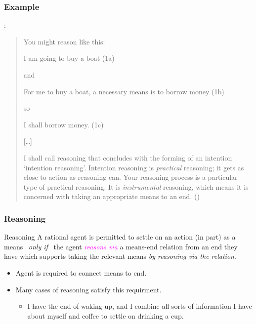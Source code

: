 \documentclass[noamssymb,
]{beamer} %
\begin{document}
\begin{frame}
  \frametitle{Example}

  \citeauthor{Broome:2002aa}:

\begin{quote}
  You might reason like this:

  \mbox{}\quad I am going to buy a boat \hfill (1a)

  and

  \mbox{}\quad For me to buy a boat, a necessary means is to borrow money \hfill (1b)

  so

  \mbox{}\quad I shall borrow money. \hfill (1c)

  \begin{center}
    [\dots]
  \end{center}

  I shall call reasoning that concludes with the forming of an intention `intention reasoning'.
  Intention reasoning is \emph{practical} reasoning; it gets as close to action as reasoning can.
  Your reasoning process is a particular type of practical reasoning.
  It is \emph{instrumental} reasoning, which means it is concerned with taking an appropriate means to an end.\nolinebreak
  \mbox{}\hfill\mbox{(\citeyear[86]{Broome:2002aa})}
\end{quote}
\end{frame}

\begin{frame}
  \frametitle{Reasoning}

  \begin{block}{Reasoning}
    A rational agent is permitted to settle on an action (in part) as a means
    \newline
    \mbox{ }\hfill\emph{only if}\hfill\mbox{ }
    \newline
    the agent \textcolor{fuchsia}{\emph{reasons via}} a means-end relation from an end they have which supports taking the relevant means \emph{by reasoning via the relation}.
  \end{block}

  \begin{itemize}
  \item Agent is required to connect means to end.
  \item Many cases of reasoning satisfy this requirment.
    \begin{itemize}
    \item I have the end of waking up, and I combine all sorts of information I have about myself and coffee to settle on drinking a cup.
    \end{itemize}
  \end{itemize}
\end{frame}
\end{document}
